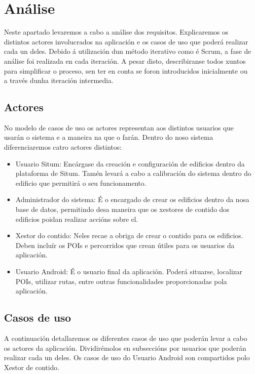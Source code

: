\chapter{Análise}

Neste apartado levaremos a cabo a análise dos requisitos. Explicaremos os distintos actores involucrados na aplicación e os casos de uso que poderá realizar cada un deles. Debido á utilización dun método iterativo como é Scrum, a fase de análise foi realizada en cada iteración. A pesar disto, describiranse todos xuntos para simplificar o proceso, sen ter en conta se foron introducidos inicialmente ou a través dunha iteración intermedia.


\section{Actores}

No modelo de casos de uso os actores representan aos distintos usuarios que usarán o sistema e a maneira na que o farán. Dentro do noso sistema diferenciaremos catro actores distintos:

\begin{itemize}
	\item Usuario Situm: Encárgase da creación e configuración de edificios dentro da plataforma de Situm. Tamén levará a cabo a calibración do sistema dentro do edificio que permitirá o seu funcionamento.
	\item Administrador do sistema: É o encargado de crear os edificios dentro da nosa base de datos, permitindo desa maneira que os xestores de contido dos edificios poidan realizar accións sobre el.
	\item Xestor do contido: Neles recae a obriga de crear o contido para os edificios. Deben incluír os POIs e percorridos que crean útiles para os usuarios da aplicación.
	\item Usuario Android: É o usuario final da aplicación. Poderá situarse, localizar POIs, utilizar rutas, entre outras funcionalidades proporcionadas pola aplicación.
\end{itemize}


\section{Casos de uso}

A continuación detallaremos os diferentes casos de uso que poderán levar a cabo os actores da aplicación. Dividirémolos en subseccións por usuarios que poderán realizar cada un deles. Os casos de uso do Usuario Android son compartidos polo Xestor de contido.


